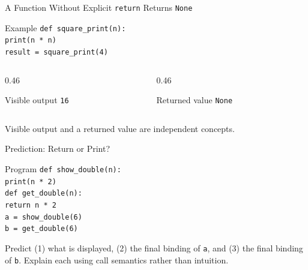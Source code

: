 \documentclass[aspectratio=169,10pt]{beamer}
\begin{document}
\begin{frame}{A Function Without Explicit \texttt{return} Returns \texttt{None}}
  \begin{block}{Example}
    \texttt{def square\_print(n):}\\
    \hspace*{0.22in}\texttt{print(n * n)}\\[0.08in]
    \texttt{result = square\_print(4)}
  \end{block}

  \begin{columns}[T,onlytextwidth]
    \begin{column}{0.46\textwidth}
      \begin{block}{Visible output}
        \centering
        \texttt{16}
      \end{block}
    \end{column}

    \begin{column}{0.46\textwidth}
      \begin{block}{Returned value}
        \centering
        \texttt{None}
      \end{block}
    \end{column}
  \end{columns}

  \begin{keyidea}
    Visible output and a returned value are independent concepts.
  \end{keyidea}
\end{frame}

\begin{frame}{Prediction: Return or Print?}
  \begin{block}{Program}
    \texttt{def show\_double(n):}\\
    \hspace*{0.22in}\texttt{print(n * 2)}\\[0.08in]
    \texttt{def get\_double(n):}\\
    \hspace*{0.22in}\texttt{return n * 2}\\[0.08in]
    \texttt{a = show\_double(6)}\\
    \texttt{b = get\_double(6)}
  \end{block}

  \begin{activity}
    Predict (1) what is displayed, (2) the final binding of \texttt{a}, and (3) the final binding of \texttt{b}. Explain each using call semantics rather than intuition.
  \end{activity}
\end{frame}
\end{document}
